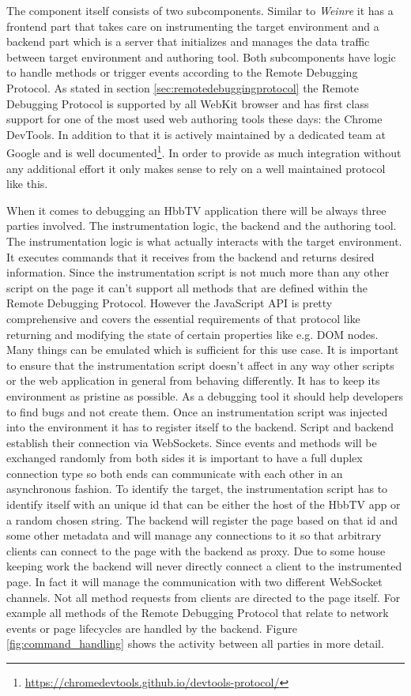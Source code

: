 The component itself consists of two subcomponents. Similar to \textit{Weinre} it has a frontend
part that takes care on instrumenting the target environment and a backend part which is a server
that initializes and manages the data traffic between target environment and authoring tool. Both
subcomponents have logic to handle methods or trigger events according to the Remote Debugging
Protocol. As stated in section \ref{sec:remotedebuggingprotocol} the Remote Debugging Protocol is
supported by all WebKit browser and has first class support for one of the most used web authoring
tools these days: the Chrome DevTools. In addition to that it is actively maintained by a dedicated
team at Google and is well documented\footnote{\url{https://chromedevtools.github.io/devtools-protocol/}}.
In order to provide as much integration without any additional effort it only makes sense to rely on
a well maintained protocol like this.

When it comes to debugging an HbbTV application there will be always three parties involved. The
instrumentation logic, the backend and the authoring tool. The instrumentation logic is what actually
interacts with the target environment. It executes commands that it receives from the backend and
returns desired information. Since the instrumentation script is not much more than any other script
on the page it can't support all methods that are defined within the Remote Debugging Protocol.
However the JavaScript API is pretty comprehensive and covers the essential requirements of that
protocol like returning and modifying the state of certain properties like e.g. DOM nodes. Many things can
be emulated which is sufficient for this use case. It is important to ensure that the instrumentation
script doesn't affect in any way other scripts or the web application in general from behaving
differently. It has to keep its environment as pristine as possible. As a debugging tool it should
help developers to find bugs and not create them. Once an instrumentation script was injected
into the environment it has to register itself to the backend. Script and backend establish their
connection via WebSockets. Since events and methods will be exchanged randomly from both sides
it is important to have a full duplex connection type so both ends can communicate with each other
in an asynchronous fashion. To identify the target, the instrumentation script has to identify
itself with an unique id that can be either the host of the HbbTV app or a random chosen string. The
backend will register the page based on that id and some other metadata and will manage any
connections to it so that arbitrary clients can connect to the page with the backend as proxy. Due
to some house keeping work the backend will never directly connect a client to the instrumented
page. In fact it will manage the communication with two different WebSocket channels. Not all method
requests from clients are directed to the page itself. For example all methods of the Remote Debugging
Protocol that relate to network events or page lifecycles are handled by the backend. Figure
\ref{fig:command_handling} shows the activity between all parties in more detail.


